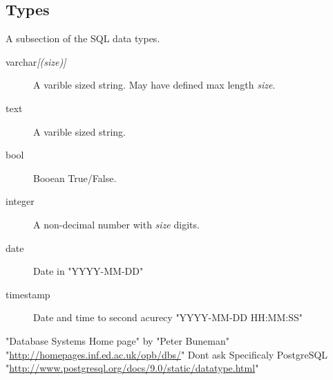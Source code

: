 \documentclass[11pt,twoside,a4paper]{article}
\begin{document}
     \subsection{Types}
      A subsection of the SQL data types\textsuperscript{\cite{postgres_data_types}}.
      \begin{description}
        \item[varchar\emph{[(size)]}] A varible sized string. May have defined max length \emph{size}.
        \item[text] A varible sized string.
        \item[bool] Booean True/False.
        \item[integer] A non-decimal number with \emph{size} digits.
        \item[date] Date in "YYYY-MM-DD"
        \item[timestamp] Date and time to second acurecy "YYYY-MM-DD HH:MM:SS"
      \end{description}
    		  
  
  \clearpage  
  \begin{thebibliography}{9}
      "Database Systems Home page" by "Peter Buneman" \\
      "\url{http://homepages.inf.ed.ac.uk/opb/dbs/}"
      Dont ask
      Specificaly PostgreSQL "\url{http://www.postgresql.org/docs/9.0/static/datatype.html}"
  \end{thebibliography}
\end{document}
